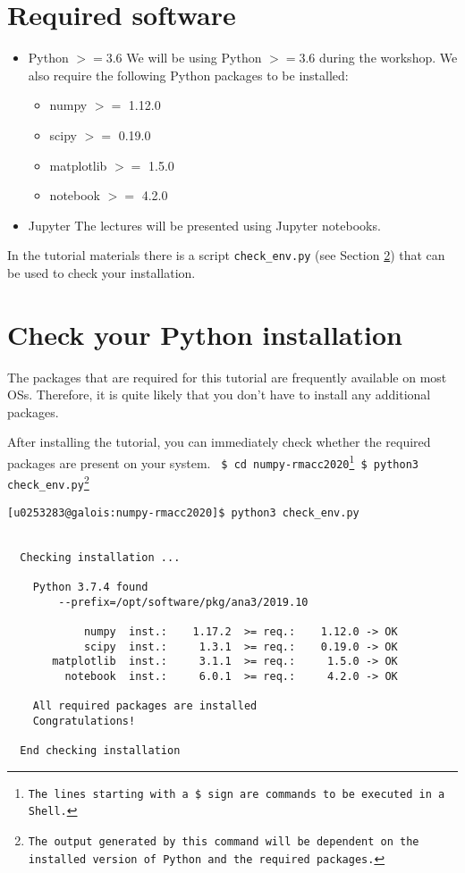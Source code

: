 \documentclass[11pt]{article}
\begin{document}
\section{Required software}
\begin{itemize}
  \item Python $>=3.6$ \newline
        We will be using Python $>=3.6$ during the workshop.
        We also require the following Python packages to be installed:
        \begin{itemize}
           \item numpy $>=$ 1.12.0 
           \item scipy $>=$ 0.19.0
           \item matplotlib $>=$ 1.5.0
           \item notebook $>=$ 4.2.0
        \end{itemize} 

  \item Jupyter \newline
        The lectures will be presented using Jupyter notebooks.
\end{itemize}

In the tutorial materials there is a script \texttt{check\_env.py} 
(see Section \ref{section:check}) that can be used to check your installation.


\section{Check your Python installation}\label{section:check}
The packages that are required for this tutorial are frequently available 
on most OSs.
Therefore, it is quite likely that you don't have to install any additional packages.

After installing the tutorial, you can immediately check whether the required packages 
are present on your system. \newline\newline
\texttt{
\$ cd numpy-rmacc2020\footnote{The lines starting with a \$ sign are commands to be executed in a Shell.} \newline
\$ python3 check\_env.py\footnote{The output generated by this command will be dependent on the installed version of Python and the required packages.}\newline
}
\begin{verbatim}
[u0253283@galois:numpy-rmacc2020]$ python3 check_env.py


  Checking installation ...

    Python 3.7.4 found
        --prefix=/opt/software/pkg/ana3/2019.10

            numpy  inst.:    1.17.2  >= req.:    1.12.0 -> OK 
            scipy  inst.:     1.3.1  >= req.:    0.19.0 -> OK 
       matplotlib  inst.:     3.1.1  >= req.:     1.5.0 -> OK 
         notebook  inst.:     6.0.1  >= req.:     4.2.0 -> OK 

    All required packages are installed
    Congratulations!

  End checking installation
\end{verbatim}
\end{document}

